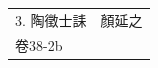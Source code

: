 \begin{longtable}{p{} p{}}

\multicolumn{2}{l}{3. 陶徵士誄　顏延之}\\
\multicolumn{2}{l}{卷38-2b}\\



















\end{longtable}
